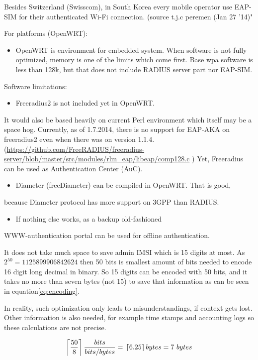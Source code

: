 \documentclass[12pt,a4paper,english]{tutthesis}
\begin{document}
\begin{otherlanguage}{english}
Besides Switzerland (Swisscom), in South Korea every mobile operator
use EAP-SIM for their authenticated Wi-Fi connection.
(source t.j.c peremen (Jan 27 '14)"



For platforms (OpenWRT):
\begin{itemize}
\item OpenWRT is environment for embedded system.
When software is not fully optimized, memory is one of the limits which come first.
Base  wpa software is less than 128k, but 
that does not include RADIUS server part nor EAP-SIM.
\end{itemize}

Software limitations: 
\begin{itemize}
\item Freeradius2 is not included yet in OpenWRT.
\end{itemize}
It would also be based heavily on current Perl environment which
itself may be a space hog. 
Currently, as of 1.7.2014, there is no support for EAP-AKA on
freeradius2 even when there was on version 1.1.4.
(\url{https://github.com/FreeRADIUS/freeradius-server/blob/master/src/modules/rlm_eap/libeap/comp128.c} )
Yet, Freeradius can be used as Authentication Center (AuC).
\begin{itemize}
\item Diameter (freeDiameter) can be compiled in OpenWRT. That is good,
\end{itemize}
because Diameter protocol has more support on 3GPP than RADIUS.
\begin{itemize}
\item If nothing else works, as a backup old-fashioned
\end{itemize}
WWW-authentication portal can be used for offline authentication.

It does not take much space to save admin IMSI which is 15 digits at
most. 
As $2^{50} = 1125899906842624$
then 50 bits is smallest amount of bits needed to encode 16 digit long
decimal in binary. So 15 digits can be encoded with
50 bits,  and it takes no more than seven bytes (not 15) to save that
information as can be seen in equation\ref{eq:encoding}.

In reality, such optimization only leads to misunderstandings, if
context gets lost. Other information is also needed, for example
time stamps and accounting logs so these calculations are not precise.

\begin{equation}
 \label{eq:encoding}
  \left \lceil \frac{50}8 \right \rceil \frac{bits}{bits/bytes} = \\
   \left \lceil 6.25 \right \rceil bytes = 7~{}bytes
\end{equation}


\end{otherlanguage}
\end{document}
